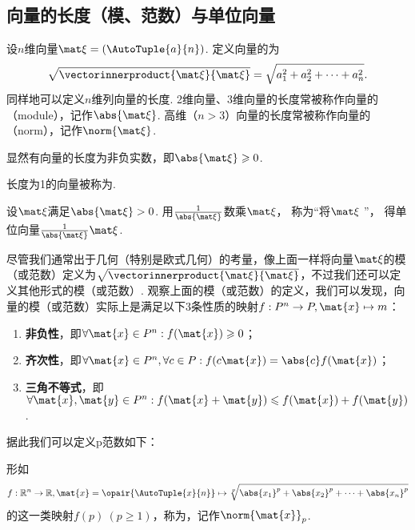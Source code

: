 \subsection{向量的长度（模、范数）与单位向量}
\begin{definition}
设\(n\)维向量\(\a = (\AutoTuple{a}{n})\).
定义向量的为\[
\sqrt{\vectorinnerproduct{\a}{\a}} = \sqrt{a_1^2+a_2^2+\dotsb+a_n^2}.
\]同样地可以定义\(n\)维列向量的长度.
2维向量、3维向量的长度常被称作向量的（module），记作\(\abs{\a}\).
高维（\(n > 3\)）向量的长度常被称作向量的（norm），记作\(\norm{\a}\).
\end{definition}

\begin{property}
显然有向量的长度为非负实数，即\(\abs{\a}\geqslant0\).
\end{property}

\begin{definition}
长度为1的向量被称为.
\end{definition}

\begin{definition}
\def\f{\frac{1}{\abs{\a}}}
设\(\a\)满足\(\abs{\a}>0\).
用\(\f\)数乘\(\a\)，
称为“将\(\a\) ”，
得单位向量\(\f\a\).
\end{definition}

尽管我们通常出于几何（特别是欧式几何）的考量，像上面一样将向量\(\a\)的模（或范数）定义为\(\sqrt{\vectorinnerproduct{\a}{\a}}\)，不过我们还可以定义其他形式的模（或范数）.
观察上面的模（或范数）的定义，我们可以发现，向量的模（或范数）实际上是满足以下3条性质的映射\(f: P^n \to P, \mat{x} \mapsto m\)：
\begin{enumerate}
\item {\bf 非负性}，即\(\forall \mat{x} \in P^n : f(\mat{x}) \geqslant 0\)；
\item {\bf 齐次性}，即\(\forall \mat{x} \in P^n, \forall c \in P : f(c \mat{x}) = \abs{c} f(\mat{x})\)；
\item {\bf 三角不等式}，即\(\forall \mat{x},\mat{y} \in P^n : f(\mat{x}+\mat{y}) \leqslant f(\mat{x}) + f(\mat{y})\).
\end{enumerate}

据此我们可以定义p范数如下：
\begin{definition}\label{definition:向量与矩阵.p范数}
形如\[
f: \mathbb{R}^n \to \mathbb{R},
\mat{x} = \opair{\AutoTuple{x}{n}}
\mapsto
\sqrt[p]{\abs{x_1}^p + \abs{x_2}^p + \dotsb + \abs{x_n}^p}
\]的这一类映射\(f(p)\ (p\geqslant1)\)，称为，记作\(\norm{\mat{x}}_p\).
\end{definition}

